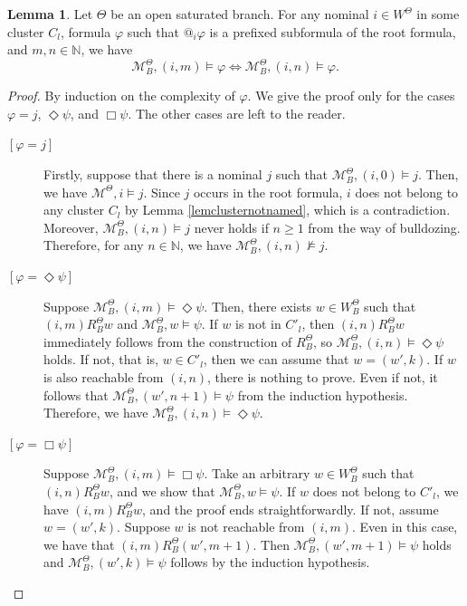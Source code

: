 \documentclass{article}
\theoremstyle{definition}
\newtheorem{lemma}[definition]{Lemma}
\newcommand{\Dia}{\Diamond}
\newcommand{\Kmodel}{\mathcal{M}}
\begin{document}
\begin{lemma}
    Let $\Theta$ be an open saturated branch. For any nominal $i \in W^\Theta$ in some cluster $C_l$, formula $\varphi$ such that $@_i \varphi$ is a prefixed subformula of the root formula, and $m, n \in \mathbb{N}$, we have
    \[
        \Kmodel^\Theta_B, (i, m) \models \varphi \iff \Kmodel^\Theta_B, (i, n) \models \varphi.
    \]
    \label{lemclusterequiv}
\end{lemma}
\vspace{-2\baselineskip}
\begin{proof}
    By induction on the complexity of $\varphi$.
    We give the proof only for the cases $\varphi = j$, $\Dia \psi$, and $\Box \psi$. The other cases are left to the reader.
    \begin{description}
        \item[{$[\varphi = j]$}] Firstly, suppose that there is a nominal $j$ such that $\Kmodel^\Theta_B, (i, 0) \models j$. Then, we have $\Kmodel^\Theta, i \models j$. Since $j$ occurs in the root formula, $i$ does not belong to any cluster $C_l$ by Lemma \ref{lemclusternotnamed}, which is a contradiction.
        Moreover, $\Kmodel^\Theta_B, (i, n) \models j$ never holds if $n \geq 1$ from the way of bulldozing. 
        Therefore, for any $n \in \mathbb{N}$, we have $\Kmodel^\Theta_B, (i, n) \not \models j$.
        \item[{$[\varphi = \Dia \psi]$}] Suppose $\Kmodel^\Theta_B, (i, m) \models \Dia \psi$. Then, there exists $w \in W^\Theta_B$ such that $(i, m) R^\Theta_B w$ and $\Kmodel^\Theta_B, w \models \psi$. If $w$ is not in $C'_l$, then $(i, n) R^\Theta_B w$ immediately follows from the construction of $R^\Theta_B$, so $\Kmodel^\Theta_B, (i, n) \models \Dia \psi$ holds. If not, that is, $w \in C'_l$, then we can assume that $w = (w', k)$. If $w$ is also reachable from $(i, n)$, there is nothing to prove. Even if not, it follows that $\Kmodel^\Theta_B, (w', n+1) \models \psi$ from the induction hypothesis. Therefore, we have $\Kmodel^\Theta_B, (i, n) \models \Dia \psi$.
        \item[{$[\varphi = \Box \psi]$}] Suppose $\Kmodel^\Theta_B, (i, m) \models \Box \psi$. Take an arbitrary $w \in W^\Theta_B$ such that $(i, n) R^\Theta_B w$, and we show that $\Kmodel^\Theta_B, w \models \psi$. If $w$ does not belong to $C'_l$, we have $(i, m) R^\Theta_B w$, and the proof ends straightforwardly. If not, assume $w = (w', k)$. Suppose $w$ is not reachable from $(i, m)$. Even in this case, we have that $(i, m) R^\Theta_B (w', m+1)$. Then $\Kmodel^\Theta_B, (w', m+1) \models \psi$ holds and $\Kmodel^\Theta_B, (w', k) \models \psi$ follows by the induction hypothesis. \qedhere
    \end{description}
\end{proof}
\end{document}
